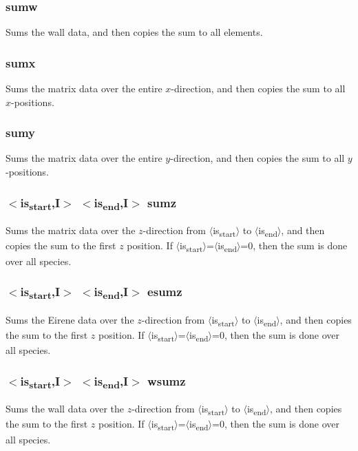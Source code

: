 \documentclass[a4paper,10pt]{report}
\begin{document}
\subsubsection{sumw}\label{sec:sumw}
Sums the wall data, and then copies the sum to all elements.

\subsubsection{sumx}\label{sec:sumx}
Sums the matrix data over the entire $x$-direction, and then copies the sum to all $x$-positions.

\subsubsection{sumy}\label{sec:sumy}
Sums the matrix data over the entire $y$-direction, and then copies the sum to all $y$-positions.

\subsubsection{$<$is\textsubscript{start},{\bf I}$>$ $<$is\textsubscript{end},{\bf I}$>$ sumz}\label{sec:sumz}
Sums the matrix data over the $z$-direction from $\langle$is\textsubscript{start}$\rangle$ to $\langle$is\textsubscript{end}$\rangle$, and then copies the
sum to the first $z$ position. If $\langle$is\textsubscript{start}$\rangle$=$\langle$is\textsubscript{end}$\rangle$=0, then the sum is done over all species.

\subsubsection{$<$is\textsubscript{start},{\bf I}$>$ $<$is\textsubscript{end},{\bf I}$>$ esumz}\label{sec:esumz}
Sums the Eirene data over the $z$-direction from $\langle$is\textsubscript{start}$\rangle$ to $\langle$is\textsubscript{end}$\rangle$, and then copies the
sum to the first $z$ position. If $\langle$is\textsubscript{start}$\rangle$=$\langle$is\textsubscript{end}$\rangle$=0, then the sum is done over all species.

\subsubsection{$<$is\textsubscript{start},{\bf I}$>$ $<$is\textsubscript{end},{\bf I}$>$ wsumz}\label{sec:wsumz}
Sums the wall data over the $z$-direction from $\langle$is\textsubscript{start}$\rangle$ to $\langle$is\textsubscript{end}$\rangle$, and then copies the
sum to the first $z$ position. If $\langle$is\textsubscript{start}$\rangle$=$\langle$is\textsubscript{end}$\rangle$=0, then the sum is done over all species.
\end{document}
